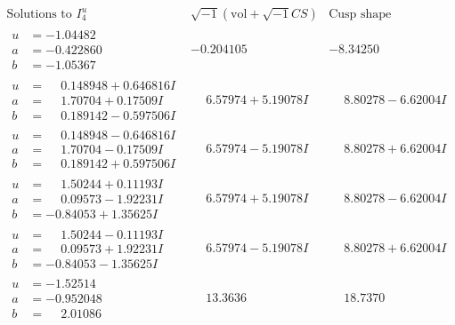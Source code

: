 \documentclass[1p]{elsarticle_modified}
\theoremstyle{definition}
\newcommand{\I}{\sqrt{-1}}
\begin{document}
$$\begin{array}{c|c|c}  
\text{Solutions to }I^u_{4}& \I (\text{vol} + \sqrt{-1}CS) & \text{Cusp shape}\\
 \hline 
\begin{aligned}
u &= -1.04482\phantom{ +0.000000I} \\
a &= -0.422860\phantom{ +0.000000I} \\
b &= -1.05367\phantom{ +0.000000I}\end{aligned}
 & -0.204105\phantom{ +0.000000I} & -8.34250\phantom{ +0.000000I} \\ \hline\begin{aligned}
u &= \phantom{-}0.148948 + 0.646816 I \\
a &= \phantom{-}1.70704 + 0.17509 I \\
b &= \phantom{-}0.189142 - 0.597506 I\end{aligned}
 & \phantom{-}6.57974 + 5.19078 I & \phantom{-}8.80278 - 6.62004 I \\ \hline\begin{aligned}
u &= \phantom{-}0.148948 - 0.646816 I \\
a &= \phantom{-}1.70704 - 0.17509 I \\
b &= \phantom{-}0.189142 + 0.597506 I\end{aligned}
 & \phantom{-}6.57974 - 5.19078 I & \phantom{-}8.80278 + 6.62004 I \\ \hline\begin{aligned}
u &= \phantom{-}1.50244 + 0.11193 I \\
a &= \phantom{-}0.09573 - 1.92231 I \\
b &= -0.84053 + 1.35625 I\end{aligned}
 & \phantom{-}6.57974 + 5.19078 I & \phantom{-}8.80278 - 6.62004 I \\ \hline\begin{aligned}
u &= \phantom{-}1.50244 - 0.11193 I \\
a &= \phantom{-}0.09573 + 1.92231 I \\
b &= -0.84053 - 1.35625 I\end{aligned}
 & \phantom{-}6.57974 - 5.19078 I & \phantom{-}8.80278 + 6.62004 I \\ \hline\begin{aligned}
u &= -1.52514\phantom{ +0.000000I} \\
a &= -0.952048\phantom{ +0.000000I} \\
b &= \phantom{-}2.01086\phantom{ +0.000000I}\end{aligned}
 & \phantom{-}13.3636\phantom{ +0.000000I} & \phantom{-}18.7370\phantom{ +0.000000I} \\ \hline\begin{aligned}

\end{aligned}
\end{array}$$
\end{document}
